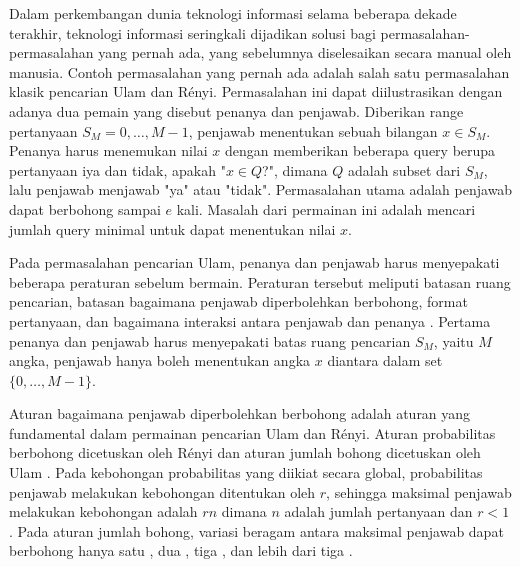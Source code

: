 \documentclass[conference,compsoc]{IEEEtran}
\begin{document}
Dalam perkembangan dunia teknologi informasi selama beberapa dekade terakhir, teknologi informasi seringkali dijadikan solusi bagi permasalahan-permasalahan yang pernah ada, yang sebelumnya diselesaikan secara manual oleh manusia. Contoh permasalahan yang pernah ada adalah salah satu permasalahan klasik pencarian Ulam dan Rényi. Permasalahan ini dapat diilustrasikan dengan adanya dua pemain yang disebut penanya dan penjawab. Diberikan range pertanyaan $S_M = {0,\ldots,M-1}$, penjawab menentukan sebuah bilangan $x \in S_M$. Penanya harus menemukan nilai $x$ dengan memberikan beberapa query berupa pertanyaan iya dan tidak, apakah "$x \in Q$?", dimana $Q$ adalah subset dari $S_M$, lalu penjawab menjawab "ya" atau "tidak". Permasalahan utama adalah penjawab dapat berbohong sampai $e$ kali. Masalah dari permainan ini adalah mencari jumlah query minimal untuk dapat menentukan nilai $x$.


Pada permasalahan pencarian Ulam, penanya dan penjawab harus menyepakati beberapa peraturan sebelum bermain. Peraturan tersebut meliputi batasan ruang pencarian, batasan bagaimana penjawab diperbolehkan berbohong, format pertanyaan, dan bagaimana interaksi antara penjawab dan penanya \cite{Pelc2002}. Pertama penanya dan penjawab harus menyepakati batas ruang pencarian $S_M$, yaitu $M$ angka, penjawab hanya boleh menentukan angka $x$ diantara dalam set $\{0,\ldots,M-1\}$.

Aturan bagaimana penjawab diperbolehkan berbohong adalah aturan yang fundamental dalam permainan pencarian Ulam dan Rényi. Aturan probabilitas berbohong dicetuskan oleh Rényi dan aturan jumlah bohong dicetuskan oleh Ulam \cite{StanislawMUlam1976}. Pada kebohongan probabilitas yang diikiat secara global, probabilitas penjawab melakukan kebohongan ditentukan oleh $r$, sehingga maksimal penjawab melakukan kebohongan adalah $rn$ dimana $n$ adalah jumlah pertanyaan dan $r<1$ \cite{Dhagat1999}. Pada aturan jumlah bohong, variasi beragam antara maksimal penjawab dapat berbohong hanya satu \cite{Ellis2008} \cite{Pelc1988}, dua \cite{Cicalese2000}, tiga \cite{Negro1992}, dan lebih dari tiga \cite{Berlekamp1998} \cite{Deppe2004}.
\end{document}
